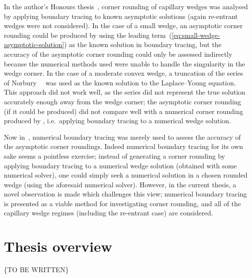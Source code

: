 In the author's Honours thesis~\cite{li-2017-thesis-rounding-capillary-wedge},
corner rounding of capillary wedges was analysed
by applying boundary tracing to known asymptotic solutions
(again re-entrant wedges were not considered).
In the case of a small wedge,
an asymptotic corner rounding could be produced
by using the leading term~(\ref{eq:small-wedge-asymptotic-solution})
as the known solution in boundary tracing,
but the accuracy of the asymptotic corner rounding
could only be assessed indirectly
because the numerical methods used were unable to handle
the singularity in the wedge corner.
In the case of a moderate convex wedge,
a truncation of the series of
Norbury~\etal~\cite{norbury-2005-corner-solutions-laplace-young}
was used as the known solution to the Laplace--Young equation.
This approach did not work well,
as the series did not represent the true solution accurately enough
away from the wedge corner;
the asymptotic corner rounding (if it could be produced)
did not compare well with a numerical corner rounding
produced by ,
i.e.~applying boundary tracing to a numerical wedge solution.

Now in~\cite{li-2017-thesis-rounding-capillary-wedge},
numerical boundary tracing was merely used
to assess the accuracy of the asymptotic corner roundings.
Indeed numerical boundary tracing for its own sake
seems a pointless exercise;
instead of generating a corner rounding
by applying boundary tracing to a numerical wedge solution
(obtained with some numerical solver),
one could simply seek a numerical solution in a chosen rounded wedge
(using the aforesaid numerical solver).
However, in the current thesis,
a novel observation is made which challenges this view;
numerical boundary tracing is presented as a viable method
for investigating corner rounding,
and all of the capillary wedge regimes (including the re-entrant case)
are considered.

\section{Thesis overview}

\{TO BE WRITTEN\}
